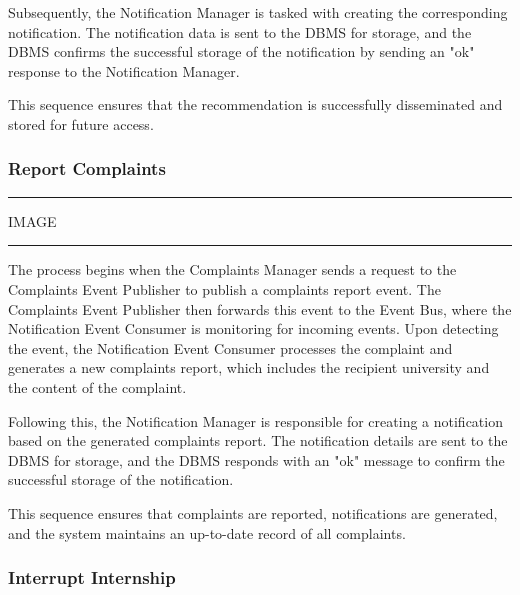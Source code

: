 Subsequently, the Notification Manager is tasked with creating the corresponding notification. The notification data is sent to the DBMS for storage, and the DBMS confirms the successful storage of the notification by sending an "ok" response to the Notification Manager.

This sequence ensures that the recommendation is successfully disseminated and stored for future access.

\subsubsection{Report Complaints}

\vspace{20pt}
\hrule
\vspace{10pt}
IMAGE
\vspace{10pt}
\hrule
\vspace{20pt}

The process begins when the Complaints Manager sends a request to the Complaints Event Publisher to publish a complaints report event. The Complaints Event Publisher then forwards this event to the Event Bus, where the Notification Event Consumer is monitoring for incoming events. Upon detecting the event, the Notification Event Consumer processes the complaint and generates a new complaints report, which includes the recipient university and the content of the complaint.

Following this, the Notification Manager is responsible for creating a notification based on the generated complaints report. The notification details are sent to the DBMS for storage, and the DBMS responds with an "ok" message to confirm the successful storage of the notification.

This sequence ensures that complaints are reported, notifications are generated, and the system maintains an up-to-date record of all complaints.

\subsubsection{Interrupt Internship}

